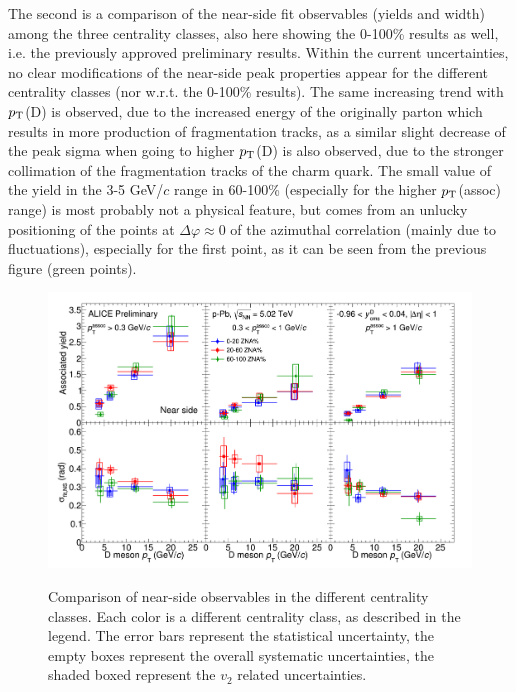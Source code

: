 The second is a comparison of the near-side fit observables (yields and width) among the three centrality classes, also here showing the 0-100\% results as well, i.e. the previously approved preliminary results. Within the current uncertainties, no clear modifications of the near-side peak properties appear for the different centrality classes (nor w.r.t. the 0-100\% results). The same increasing trend with $p_{\rm T}$(D) is observed, due to the increased energy of the originally parton which results in more production of fragmentation tracks, as a similar slight decrease of the peak sigma when going to higher $p_{\rm T}$(D) is also observed, due to the stronger collimation of the fragmentation tracks of the charm quark. The small value of the yield in the 3-5 GeV/$c$ range in 60-100\% (especially for the higher $p_{\rm T}$(assoc) range) is most probably not a physical feature, but comes from an unlucky positioning of the points at $\Delta\varphi \approx 0$ of the azimuthal correlation (mainly due to fluctuations), especially for the first point, as it can be seen from the previous figure (green points).

\begin{landscape}
\begin{figure}
\centering
{\includegraphics[width=0.95\linewidth]{figuresVsCent/Averages/Trends/ComparePPbVsCentFitResults_FinalQM.png}}
 \caption{Comparison of near-side observables in the different centrality classes. Each color is a different centrality class, as described in the legend. The error bars represent the statistical uncertainty, the empty boxes represent the overall systematic uncertainties, the shaded boxed represent the $v_2$ related uncertainties.}
\label{fig:prel2}
\end{figure}
\end{landscape}

